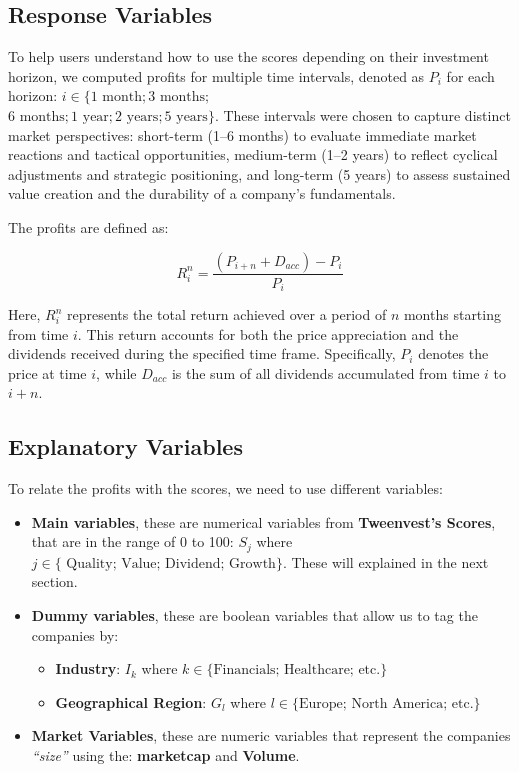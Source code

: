 \documentclass[11pt,english,a4paper,hidelinks]{book}
\begin{document}
\subsection{Response Variables}
To help users understand how to use the scores depending on their investment horizon, we computed profits for multiple time intervals, denoted as \(P_i\) for each horizon: \(i \in \{1 \text{ month}; 3 \text{ months};\)\\
\(6 \text{ months}; 1 \text{ year}; 2 \text{ years}; 5 \text{ years}\}\). These intervals were chosen to capture distinct market perspectives: short-term (1–6 months) to evaluate immediate market reactions and tactical opportunities, medium-term (1–2 years) to reflect cyclical adjustments and strategic positioning, and long-term (5 years) to assess sustained value creation and the durability of a company’s fundamentals.

\vspace{0.5cm}
\noindent The profits are defined as:

\begin{equation}
    R_i^n = \frac{(P_{i+n} + D_{acc}) - P_{i}}{P_{i}}
\end{equation}

\noindent Here, \(R_i^n\) represents the total return achieved over a period of \(n\) months starting from time \(i\). This return accounts for both the price appreciation and the dividends received during the specified time frame. Specifically, \(P_i\) denotes the price at time \(i\), while \(D_{acc}\) is the sum of all dividends accumulated from time \(i\) to \(i+n\).


\subsection{Explanatory Variables}
To relate the profits with the scores, we need to use different variables:
\begin{itemize}
    \item \textbf{Main variables}, these are numerical variables from \textbf{Tweenvest's Scores}, that are in the range of 0 to 100: \(S_j\) where   \(j \in \{\text{ Quality; Value; Dividend; Growth}\}\). These will explained in the next section.
    \item \textbf{Dummy variables}, these are boolean variables that allow us to tag the companies by:
    \begin{itemize}
        \item \textbf{Industry}: \(I_k\) where \(k \in \{\text{Financials; Healthcare; etc.}\}\)
        \item \textbf{Geographical Region}: \(G_l\) where \(l \in \{\text{Europe; North America; etc.}\}\)
    \end{itemize}
    \item \textbf{Market Variables}, these are numeric variables that represent the companies \textit{``size''} using the: \textbf{\acrshort{marketcap}} and \textbf{Volume}.
\end{itemize}
\end{document}

